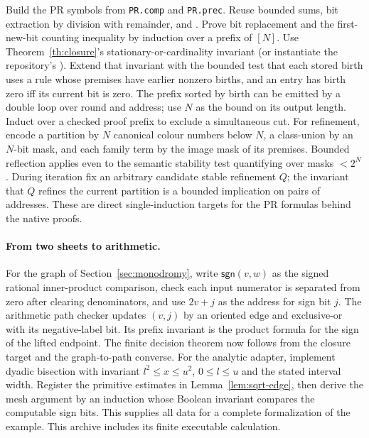 Build the PR symbols from \texttt{PR.comp} and \texttt{PR.prec}. Reuse bounded sums, bit extraction by division with remainder, and . Prove bit replacement and the first-new-bit counting inequality by induction over a prefix of $[N]$. Use Theorem~\ref{th:closure}'s stationary-or-cardinality invariant (or instantiate the repository's ). Extend that invariant with the bounded test that each stored birth uses a rule whose premises have earlier nonzero births, and an entry has birth zero iff its current bit is zero. The prefix sorted by birth can be emitted by a double loop over round and address; use $N$ as the bound on its output length. Induct over a checked proof prefix to exclude a simultaneous cut. For refinement, encode a partition by $N$ canonical colour numbers below $N$, a class-union by an $N$-bit mask, and each family term by the image mask of its premises. Bounded reflection applies even to the semantic stability test quantifying over masks $<2^N$. During iteration fix an arbitrary candidate stable refinement $Q$; the invariant that $Q$ refines the current partition is a bounded implication on pairs of addresses. These are direct single-induction targets for the PR formulas behind the native proofs.

\paragraph{From two sheets to arithmetic.}
For the graph of Section~\ref{sec:monodromy}, write $\mathsf{sgn}(v,w)$ as the signed rational inner-product comparison, check each input numerator is separated from zero after clearing denominators, and use $2v+j$ as the address for sign bit $j$. The arithmetic path checker updates $(v,j)$ by an oriented edge and exclusive-or with its negative-label bit. Its prefix invariant is the product formula for the sign of the lifted endpoint. The finite decision theorem now follows from the closure target and the graph-to-path converse. For the analytic adapter, implement dyadic bisection with invariant $l^2\le x\le u^2$, $0\le l\le u$ and the stated interval width. Register the primitive estimates in Lemma~\ref{lem:sqrt-edge}, then derive the mesh argument by an induction whose Boolean invariant compares the computable sign bits. This supplies all data for a complete formalization of the example. This archive includes its finite executable calculation.


